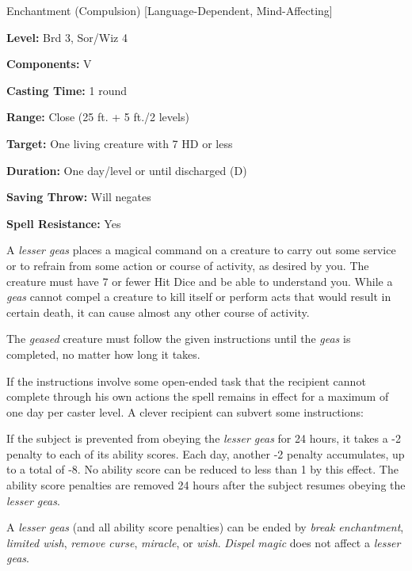\label{spell:Lesser Geas}

Enchantment (Compulsion) [Language-Dependent, Mind-Affecting]

\textbf{Level:} Brd 3, Sor/Wiz 4

\textbf{Components:} V

\textbf{Casting Time:} 1 round

\textbf{Range:} Close (25 ft. + 5 ft./2 levels)

\textbf{Target:} One living creature with 7 HD or less

\textbf{Duration:} One day/level or until discharged (D)

\textbf{Saving Throw:} Will negates

\textbf{Spell Resistance:} Yes

A \textit{lesser geas} places a magical command on a creature to carry out some 
service or to refrain from some action or course of activity, as desired by you. 
The creature must have 7 or fewer Hit Dice and be able to understand you. While 
a \textit{geas} cannot compel a creature to kill itself or perform acts that would 
result in certain death, it can cause almost any other course of activity.

The \textit{geased} creature must follow the given instructions until the \textit{geas 
}is completed, no matter how long it takes.

If the instructions involve some open-ended task that the recipient cannot complete 
through his own actions the spell remains in effect for a maximum of one day per 
caster level. A clever recipient can subvert some instructions:

If the subject is prevented from obeying the \textit{lesser geas} for 24 hours, 
it takes a -2 penalty to each of its ability scores. Each day, another -2 penalty 
accumulates, up to a total of -8. No ability score can be reduced to less than 
1 by this effect. The ability score penalties are removed 24 hours after the subject 
resumes obeying the \textit{lesser geas}.

A \textit{lesser geas} (and all ability score penalties) can be ended by \textit{break 
enchantment}, \textit{limited wish}, \textit{remove curse}, \textit{miracle}, or 
\textit{wish}. \textit{Dispel magic} does not affect a \textit{lesser geas}.

